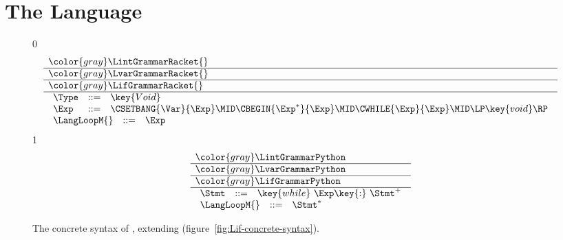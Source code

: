 \documentclass[7x10]{TimesAPriori_MIT}%
\newcommand{\gray}[1]{{\color{gray} #1}}
\def\racketEd{0}
\def\pythonEd{1}
\def\edition{1}
\newcommand{\pythonColor}[0]{}
\numberwithin{theorem}{chapter}
\numberwithin{definition}{chapter}
\numberwithin{equation}{chapter}
\begin{document}
\section{The \LangLoop{} Language}

\newcommand{\LwhileGrammarRacket}{
  \begin{array}{lcl}
   \Type &::=& \key{Void}\\
   \Exp &::=& \CSETBANG{\Var}{\Exp}
      \MID \CBEGIN{\Exp^{*}}{\Exp}
      \MID \CWHILE{\Exp}{\Exp} \MID \LP\key{void}\RP 
  \end{array}
}
\newcommand{\LwhileASTRacket}{
\begin{array}{lcl}
  \Type &::=& \key{Void}\\
  \Exp &::=& \SETBANG{\Var}{\Exp}
       \MID \BEGIN{\Exp^{*}}{\Exp}
       \MID \WHILE{\Exp}{\Exp}
       \MID \VOID{}  
\end{array}
}

\newcommand{\LwhileGrammarPython}{
\begin{array}{rcl}
  \Stmt &::=& \key{while}~ \Exp \key{:}~ \Stmt^{+}
\end{array}
}
\newcommand{\LwhileASTPython}{
\begin{array}{lcl}
\Stmt{} &::=& \WHILESTMT{\Exp}{\Stmt^{+}}
\end{array}
}

\begin{figure}[tp]
\centering
\begin{tcolorbox}[colback=white]
    \small
{\if\edition\racketEd    
\[
\begin{array}{l}
  \gray{\LintGrammarRacket{}} \\ \hline
  \gray{\LvarGrammarRacket{}} \\ \hline
  \gray{\LifGrammarRacket{}} \\ \hline
  \LwhileGrammarRacket \\
  \begin{array}{lcl}
  \LangLoopM{} &::=& \Exp
\end{array}
\end{array}
\]
\fi}
{\if\edition\pythonEd\pythonColor
\[
\begin{array}{l}
  \gray{\LintGrammarPython} \\ \hline
  \gray{\LvarGrammarPython}  \\ \hline
  \gray{\LifGrammarPython} \\ \hline
  \LwhileGrammarPython \\
\begin{array}{rcl}
  \LangLoopM{} &::=& \Stmt^{*}
\end{array}
\end{array}
\]
\fi}
\end{tcolorbox}

\caption{The concrete syntax of \LangLoop{}, extending \LangIf{} (figure~\ref{fig:Lif-concrete-syntax}).}
\label{fig:Lwhile-concrete-syntax}
\end{figure}
\end{document}
